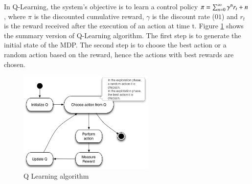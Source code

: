 \documentclass{report}
\begin{document}
In Q-Learning, the system's objective is to learn a control policy $\pi = \sum_{n=0}^{\infty} \gamma\textsuperscript{n}  r_{t}+n $, where $\pi$  is the discounted cumulative reward, $\gamma$ is the discount rate ($01$) and $r_{t}$ is the reward received after  the execution of an action at time t. Figure \ref{fig:qalgo} shows the summary version of Q-Learning algorithm. The first step is to generate the initial state of the MDP. The second step is to choose the best action or a random action based on the reward, hence the actions with best rewards are chosen.

\begin{figure}[h]
\centering
\includegraphics[width=0.6\textwidth]{./images/qalgo.png}
\caption{Q Learning algorithm}
\label{fig:qalgo}
\end{figure}
\end{document}
